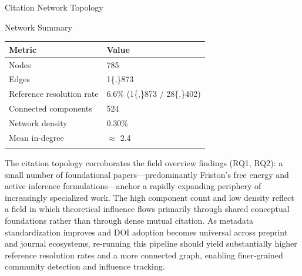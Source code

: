 \documentclass[
  ignorenonframetext,
]{beamer}
\newcounter{none} %
\begin{document}
\begin{frame}{Citation Network Topology \label{sec:citation_network}}
\begin{block}{Network Summary}
\protect{}\label{network-summary}
{\def\LTcaptype{none} %
\begin{longtable}[]{@{}ll@{}}
\toprule\noalign{}
Metric & Value \\
\midrule\noalign{}
\endhead
Nodes & 785 \\
Edges & 1\{,\}873 \\
Reference resolution rate & 6.6\% (1\{,\}873 / 28\{,\}402) \\
Connected components & 524 \\
Network density & 0.30\% \\
Mean in-degree & \(\approx\) 2.4 \\
\bottomrule\noalign{}
\end{longtable}
}

The citation topology corroborates the field overview findings (RQ1,
RQ2): a small number of foundational papers---predominantly Friston's
free energy and active inference formulations---anchor a rapidly
expanding periphery of increasingly specialized work. The high component
count and low density reflect a field in which theoretical influence
flows primarily through shared conceptual foundations rather than
through dense mutual citation. As metadata standardization improves and
DOI adoption becomes universal across preprint and journal ecosystems,
re-running this pipeline should yield substantially higher reference
resolution rates and a more connected graph, enabling finer-grained
community detection and influence tracking.
\end{block}
\end{frame}
\end{document}

